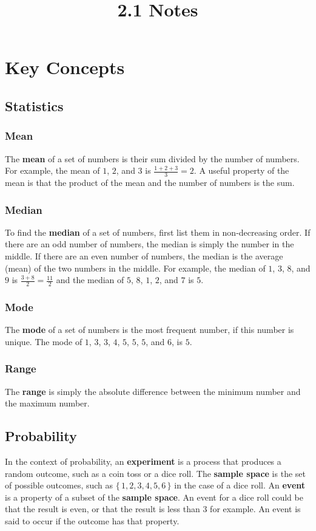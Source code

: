 \documentclass[twocolumn]{article}
\title{2.1 Notes}
\author{}
\date{}
\begin{document}
	\maketitle
	
	\section*{Key Concepts}

	\subsection*{Statistics}
	
	\subsubsection*{Mean}
	The \textbf{mean} of a set of numbers is their sum divided by the number of
	numbers. For example, the mean of $1$, $2$, and $3$ is $\frac{1 + 2 + 3}{3}
	= 2$. A useful property of the mean is that the product of the mean and the
	number of numbers is the sum.

	\subsubsection*{Median}
	To find the \textbf{median} of a set of numbers, first list them in
	non-decreasing order. If there are an odd number of numbers, the median is
	simply the number in the middle. If there are an even number of numbers, the
	median is the average (mean) of the two numbers in the middle. For example,
	the median of $1$, $3$, $8$, and $9$ is $\frac{3 + 8}{2} = \frac{11}{2}$ and
	the median of $5$, $8$, $1$, $2$, and $7$ is $5$.

	\subsubsection*{Mode}
	The \textbf{mode} of a set of numbers is the most frequent number, if this
	number is unique. The mode of $1$, $3$, $3$, $4$, $5$, $5$, $5$, and $6$, is
	$5$.

	\subsubsection*{Range}
	The \textbf{range} is simply the absolute difference between the minimum
	number and the maximum number.

	\subsection*{Probability}
	In the context of probability, an \textbf{experiment} is a process that
	produces a random outcome, such as a coin toss or a dice roll. The
	\textbf{sample space} is the set of possible outcomes, such as $\{\, 1, 2,
	3, 4, 5, 6 \,\}$ in the case of a dice roll. An \textbf{event} is a property
	of a subset of the \textbf{sample space}. An event for a dice roll could be
	that the result is even, or that the result is less than $3$ for example. An
	event is said to occur if the outcome has that property.
\end{document}
